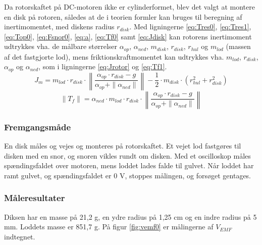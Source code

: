 Da rotorskaftet på DC-motoren ikke er cylinderformet, blev det valgt at montere en disk
på rotoren, således at de i teorien formler kan bruges til beregning af inertimomentet,
med diskens radius \(r_{disk}\).
Med ligningerne \ref{eq:Tres0}, \ref{eq:Tres1}, \ref{eq:Top0}, \ref{eq:Fsnor0}, \ref{eq:a}, \ref{eq:Tf0} samt \ref{eq:Jdisk}
kan rotorens inertimoment udtrykkes vha. de målbare størrelser
\(\alpha_{op}\), \(\alpha_{ned}\), \(m_{disk}\), \(r_{disk}\), \(r_{hul}\) og \(m_{lod}\) (massen af det fastgjorte lod),
mens friktionskraftmomentet kan udtrykkes vha. \(m_{lod}\), \(r_{disk}\), \(\alpha_{op}\) og \(\alpha_{ned}\),
som i ligningerne \ref{eq:Jrotor} og \ref{eq:Tf1}.
\begin{equation}
	J_{m}=	m_{lod}\cdot{r_{disk}}\cdot\left\|\frac{\alpha_{op}\cdot{r_{disk}}-g}{\alpha_{op}+\|\alpha_{ned}\|}\right\|
			-\frac{1}{2}\cdot{m_{disk}}\cdot\left(r_{hul}^2+r_{disk}^2\right)
	\label{eq:Jrotor}
\end{equation}
\begin{equation}
	\|T_f\|= \alpha_{ned}\cdot{m_{lod}}\cdot{r_{disk}}\cdot\left\|\frac{\alpha_{op}\cdot{r_{disk}}-g}{\alpha_{op}+\|\alpha_{ned}\|}\right\|
	\label{eq:Tf1}
 \end{equation}
\subsubsection{Fremgangsmåde}
En disk måles og vejes og monteres på rotorskaftet.
Et vejet lod fastgøres til disken med en snor, og snoren vikles rundt om disken.
Med et oscilloskop måles spændingsfaldet over motoren, mens loddet lades falde til gulvet.
Når loddet har ramt gulvet, og spændingsfaldet er 0 V, stoppes målingen, og forsøget gentages.
\subsubsection{Måleresultater}
Diksen har en masse på 21,2 g, en ydre radius på 1,25 cm og en indre radius på 5 mm.
Loddets masse er 851,7 g.
På figur \ref{fig:vemf0} er målingerne af \(V_{EMF}\) indtegnet.

